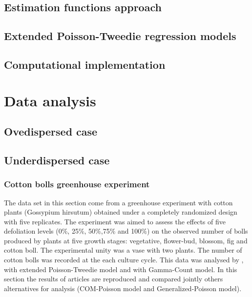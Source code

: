 \documentclass[9pt,a5paper,]{book}
\begin{document}
\section{Estimation functions
approach}\label{estimation-functions-approach}

\section{Extended Poisson-Tweedie regression
models}\label{extended-poisson-tweedie-regression-models}

\section{Computational
implementation}\label{computational-implementation-1}

\chapter{Data analysis}\label{data-analysis}

\section{Ovedispersed case}\label{ovedispersed-case}

\section{Underdispersed case}\label{underdispersed-case}

\subsection{Cotton bolls greenhouse
experiment}\label{cotton-bolls-greenhouse-experiment}

The data set in this section come from a greenhouse experiment with
cotton plants (Gossypium hirsutum) obtained under a completely
randomized design with five replicates. The experiment was aimed to
assess the effects of five defoliation levels (0\%, 25\%, 50\%,75\% and
100\%) on the observed number of bolls produced by plants at five growth
stages: vegetative, flower-bud, blossom, fig and cotton boll. The
experimental unity was a vase with two plants. The number of cotton
bolls was recorded at the each culture cycle. This data was analysed by
\citet{bonat2016b}, with extended Poisson-Tweedie model and
\citet{zeviani2014} with Gamma-Count model. In this section the results
of articles are reproduced and compared jointly others alternatives for
analysis (COM-Poisson model and Generalized-Poisson model).
\end{document}
